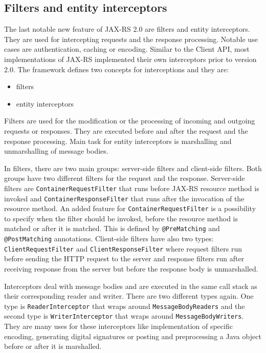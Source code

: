 \documentclass[12pt,final,oneside]{fithesis2}
\begin{document}
\subsection*{Filters and entity interceptors}
The last notable new feature of JAX-RS 2.0 are filters and entity interceptors. They are used for intercepting requests and the response processing. Notable use cases are authentication, caching or encoding. Similar to the Client API, most implementations of JAX-RS implemented their own interceptors prior to version 2.0. The framework defines two concepts for interceptions and they are:
\begin{itemize}
\item 
filters

\item
entity interceptors
\end{itemize}

Filters are used for the modification or the processing of incoming and outgoing requests or responses. They are executed before and after the request and the response processing. Main task for entity interceptors is marshalling and unmarshalling of message bodies.

In filters, there are two main groups: server-side filters and client-side filters. Both groups have two different filters for the request and  the response. Server-side filters are \texttt{ContainerRequestFilter} that runs before JAX-RS resource method is invoked and \texttt{ContainerResponseFilter} that runs after the invocation of the resource method. An added feature for \texttt{ContainerRequestFilter} is a possibility to specify when the filter should be invoked, before the resource method is matched or after it is matched. This is defined by \texttt{@PreMatching} and \texttt{@PostMatching} annotations. Client-side filters have also two types: \texttt{ClientRequestFilter} and \texttt{ClientResponseFilter} where request filters run before sending the HTTP request to the server and response filters run after receiving response from the server but before the response body is unmarshalled. \cite{jax-rs-2.0}\cite{resteasy-book}

Interceptors deal with message bodies and are executed in the same call stack as their corresponding reader and writer. There are two different types again. One type is \texttt{ReaderInterceptor} that wraps around \texttt{MessageBodyReaders} and the second type is \texttt{WriterInterceptor} that wraps around \texttt{MessageBodyWriters}. They are many uses for these interceptors like implementation of specific encoding, generating digital signatures or posting and preprocessing a Java object before or after it is marshalled.\cite{jax-rs-2.0}\cite{cxf-jax}
\end{document}
